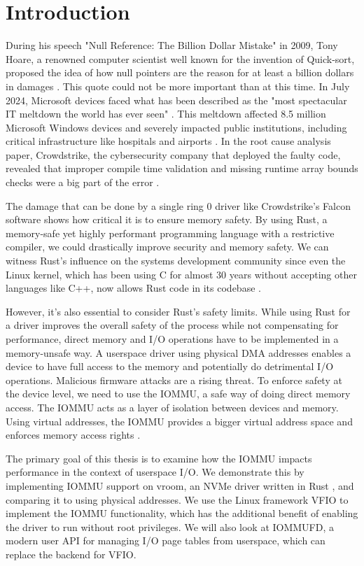 \chapter{Introduction}\label{c:introduction}

During his speech "Null Reference: The Billion Dollar Mistake" in 2009, Tony Hoare, a renowned computer scientist well known for the invention of Quick-sort, proposed the idea of how null pointers are the reason for at least a billion dollars in damages \cite{billiondollarmistake}. This quote could not be more important than at this time. In July 2024, Microsoft devices faced what has been described as the "most spectacular IT meltdown the world has ever seen" \cite{bloombergmeltdown}. This meltdown affected 8.5 million Microsoft Windows devices and severely impacted public institutions, including critical infrastructure like hospitals and airports \cite{bloomberg8milliondevices}. In the root cause analysis paper, Crowdstrike, the cybersecurity company that deployed the faulty code, revealed that improper compile time validation and missing runtime array bounds checks were a big part of the error \cite{crowdstrikerca}.

The damage that can be done by a single ring 0 driver like Crowdstrike's Falcon software shows how critical it is to ensure memory safety. By using Rust, a memory-safe yet highly performant programming language with a restrictive compiler, we could drastically improve security and memory safety. We can witness Rust's influence on the systems development community since even the Linux kernel, which has been using C for almost 30 years without accepting other languages like C++, now allows Rust code in its codebase \cite{linuxrustpull}.

However, it's also essential to consider Rust's safety limits. While using Rust for a driver improves the overall safety of the process while not compensating for performance, direct memory and I/O operations have to be implemented in a memory-unsafe way. A userspace driver using physical DMA addresses enables a device to have full access to the memory and potentially do detrimental I/O operations. Malicious firmware attacks are a rising threat.
To enforce safety at the device level, we need to use the IOMMU, a safe way of doing direct memory access. The IOMMU acts as a layer of isolation between devices and memory. Using virtual addresses, the IOMMU provides a bigger virtual address space and enforces memory access rights \cite{OLS2007}.

The primary goal of this thesis is to examine how the IOMMU impacts performance in the context of userspace I/O.
We demonstrate this by implementing IOMMU support on vroom, an NVMe driver written in Rust \cite{vroom}, and comparing it to using physical addresses. We use the Linux framework VFIO to implement the IOMMU functionality, which has the additional benefit of enabling the driver to run without root privileges. We will also look at IOMMUFD, a modern user API for managing I/O page tables from userspace, which can replace the backend for VFIO.
